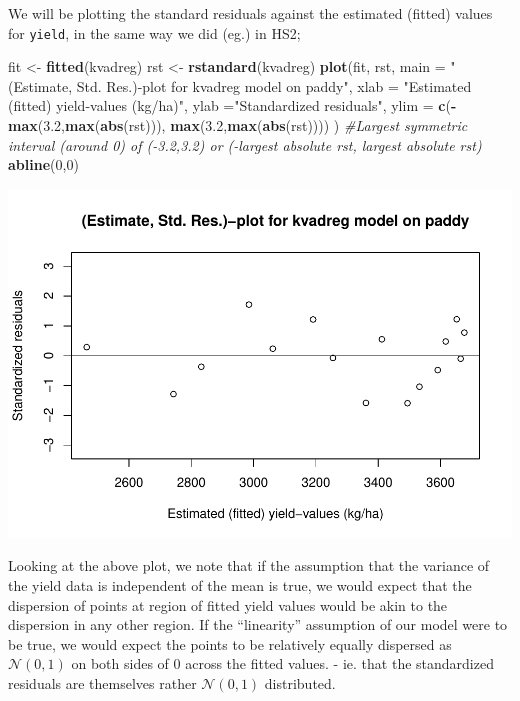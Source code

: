 \documentclass[
]{article}
\newenvironment{Shaded}{\begin{snugshade}}{\end{snugshade}}
\newcommand{\CommentTok}[1]{\textcolor[rgb]{0.56,0.35,0.01}{\textit{#1}}}
\newcommand{\DataTypeTok}[1]{\textcolor[rgb]{0.13,0.29,0.53}{#1}}
\newcommand{\DecValTok}[1]{\textcolor[rgb]{0.00,0.00,0.81}{#1}}
\newcommand{\FloatTok}[1]{\textcolor[rgb]{0.00,0.00,0.81}{#1}}
\newcommand{\KeywordTok}[1]{\textcolor[rgb]{0.13,0.29,0.53}{\textbf{#1}}}
\newcommand{\NormalTok}[1]{#1}
\newcommand{\OperatorTok}[1]{\textcolor[rgb]{0.81,0.36,0.00}{\textbf{#1}}}
\newcommand{\StringTok}[1]{\textcolor[rgb]{0.31,0.60,0.02}{#1}}
\begin{document}
We will be plotting the standard residuals against the estimated
(fitted) values for \texttt{yield}, in the same way we did (eg.) in HS2;

\begin{Shaded}
\begin{Highlighting}[]
\NormalTok{fit <-}\StringTok{ }\KeywordTok{fitted}\NormalTok{(kvadreg)}
\NormalTok{rst <-}\StringTok{ }\KeywordTok{rstandard}\NormalTok{(kvadreg)}
\KeywordTok{plot}\NormalTok{(fit, rst, }\DataTypeTok{main =} \StringTok{"(Estimate, Std. Res.)-plot for kvadreg model on paddy"}\NormalTok{, }\DataTypeTok{xlab =} \StringTok{"Estimated (fitted) yield-values (kg/ha)"}\NormalTok{, }\DataTypeTok{ylab =}\StringTok{"Standardized residuals"}\NormalTok{, }\DataTypeTok{ylim =} \KeywordTok{c}\NormalTok{(}\OperatorTok{-}\KeywordTok{max}\NormalTok{(}\FloatTok{3.2}\NormalTok{,}\KeywordTok{max}\NormalTok{(}\KeywordTok{abs}\NormalTok{(rst))), }\KeywordTok{max}\NormalTok{(}\FloatTok{3.2}\NormalTok{,}\KeywordTok{max}\NormalTok{(}\KeywordTok{abs}\NormalTok{(rst)))) ) }\CommentTok{#Largest symmetric interval (around 0) of (-3.2,3.2) or (-largest absolute rst, largest absolute rst)}
\KeywordTok{abline}\NormalTok{(}\DecValTok{0}\NormalTok{,}\DecValTok{0}\NormalTok{)}
\end{Highlighting}
\end{Shaded}

\begin{center}\includegraphics{matstatproblems20-21_files/figure-latex/unnamed-chunk-50-1} \end{center}

Looking at the above plot, we note that if the assumption that the
variance of the yield data is independent of the mean is true, we would
expect that the dispersion of points at region of fitted yield values
would be akin to the dispersion in any other region. If the
``linearity'' assumption of our model were to be true, we would expect
the points to be relatively equally dispersed as \(\mathcal{N}(0,1)\) on
both sides of \(0\) across the fitted values. - ie. that the
standardized residuals are themselves rather \(\mathcal{N}(0,1)\)
distributed.
\end{document}
